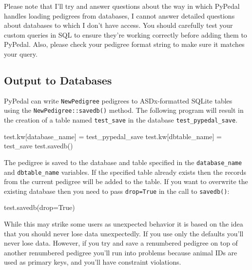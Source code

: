\documentclass[
  letterpaper,
  DIV=11,
  numbers=noendperiod]{scrreprt}
\newenvironment{Shaded}{\begin{snugshade}}{\end{snugshade}}
\newcommand{\NormalTok}[1]{\textcolor[rgb]{0.00,0.23,0.31}{#1}}
\newcommand{\OperatorTok}[1]{\textcolor[rgb]{0.37,0.37,0.37}{#1}}
\newcommand{\StringTok}[1]{\textcolor[rgb]{0.13,0.47,0.30}{#1}}
\newcommand{\VariableTok}[1]{\textcolor[rgb]{0.07,0.07,0.07}{#1}}
\begin{document}
Please note that I'll try and answer questions about the way in which
PyPedal handles loading pedigrees from databases, I cannot answer
detailed questions about databases to which I don't have access. You
should carefully test your custom queries in SQL to ensure they're
working correctly before adding them to PyPedal. Also, please check your
pedigree format string to make sure it matches your query.

\subsection{Output to Databases}\label{output-to-databases}

PyPedal can write \texttt{NewPedigree} pedigrees to ASDx-formatted
SQLite tables using the \texttt{NewPedigree::savedb()} method. The
following program will result in the creation of a table named
\texttt{test\_save} in the database \texttt{test\_pypedal\_save}.

\begin{Shaded}
\begin{Highlighting}[]
\NormalTok{test.kw[}\StringTok{\textquotesingle{}database\_name\textquotesingle{}}\NormalTok{] }\OperatorTok{=} \StringTok{\textquotesingle{}test\_pypedal\_save\textquotesingle{}}
\NormalTok{test.kw[}\StringTok{\textquotesingle{}dbtable\_name\textquotesingle{}}\NormalTok{] }\OperatorTok{=} \StringTok{\textquotesingle{}test\_save\textquotesingle{}}
\NormalTok{test.savedb()}
\end{Highlighting}
\end{Shaded}

The pedigree is saved to the database and table specified in the
\texttt{database\_name} and \texttt{dbtable\_name} variables. If the
specified table already exists then the records from the current
pedigree will be added to the table. If you want to overwrite the
existing database then you need to pass \texttt{drop=True} in the call
to \texttt{savedb()}:

\begin{Shaded}
\begin{Highlighting}[]
\NormalTok{test.savedb(drop}\OperatorTok{=}\VariableTok{True}\NormalTok{)}
\end{Highlighting}
\end{Shaded}

While this may strike some users as unexpected behavior it is based on
the idea that you should never lose data unexpectedly. If you use only
the defaults you'll never lose data. However, if you try and save a
renumbered pedigree on top of another renumbered pedigree you'll run
into problems because animal IDs are used as primary keys, and you'll
have constraint violations.
\end{document}
